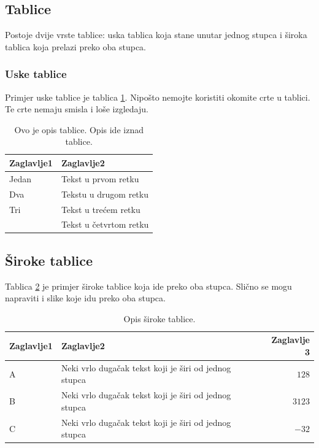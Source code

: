 \documentclass[10pt, a4paper]{article}
\begin{document}
\subsection{Tablice}

Postoje dvije vrste tablice: uska tablica koja stane unutar jednog
stupca i široka tablica koja prelazi 
preko oba stupca.

\subsubsection{Uske tablice}

Primjer uske tablice je tablica \ref{tab:uska-tablica}. Nipošto
nemojte koristiti okomite crte u tablici. Te crte nemaju smisla i loše
izgledaju.


\begin{table}
\caption{Ovo je opis tablice. Opis ide iznad tablice.}
\label{tab:uska-tablica}
\begin{center}
\begin{tabular}{ll}
\toprule
Zaglavlje1 & Zaglavlje2 \\
\midrule
Jedan & Tekst u prvom retku\\
Dva   & Tekstu u drugom retku\\
Tri   & Tekst u trećem retku\\
      & Tekst u četvrtom retku\\
\bottomrule
\end{tabular}
\end{center}
\end{table}

\subsection{Široke tablice}

Tablica \ref{tab:siroka-tablica} je primjer široke tablice koja ide
preko oba stupca. Slično se mogu napraviti i slike koje idu preko oba
stupca.

\begin{table}
\caption{Opis široke tablice.}
\label{tab:siroka-tablica}
\begin{center}
\begin{tabular}{llr}
\toprule
Zaglavlje1 & Zaglavlje2 & Zaglavlje 3\\
\midrule
A & Neki vrlo dugačak tekst koji je širi od jednog stupca & $128$\\
B & Neki vrlo dugačak tekst koji je širi od jednog stupca & $3123$\\
C & Neki vrlo dugačak tekst koji je širi od jednog stupca & $-32$\\
\bottomrule
\end{tabular}
\end{center}
\end{table}
\end{document}
